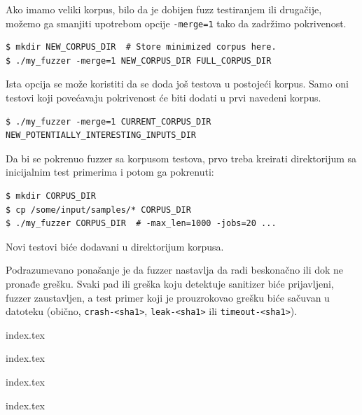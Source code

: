Ako imamo veliki korpus, bilo da je dobijen fuzz testiranjem ili drugačije, možemo ga smanjiti upotrebom opcije \texttt{-merge=1} tako da zadržimo pokrivenost.

\begin{verbatim}
$ mkdir NEW_CORPUS_DIR  # Store minimized corpus here.
$ ./my_fuzzer -merge=1 NEW_CORPUS_DIR FULL_CORPUS_DIR
\end{verbatim}

Ista opcija se može koristiti da se doda još testova u postojeći korpus. Samo oni testovi koji povećavaju pokrivenost će biti dodati u prvi navedeni korpus.

\begin{verbatim}
$ ./my_fuzzer -merge=1 CURRENT_CORPUS_DIR NEW_POTENTIALLY_INTERESTING_INPUTS_DIR
\end{verbatim}

Da bi se pokrenuo fuzzer sa korpusom testova, prvo treba kreirati direktorijum sa inicijalnim test primerima i potom ga pokrenuti:

\begin{verbatim}
$ mkdir CORPUS_DIR
$ cp /some/input/samples/* CORPUS_DIR
$ ./my_fuzzer CORPUS_DIR  # -max_len=1000 -jobs=20 ...
\end{verbatim}

Novi testovi biće dodavani u direktorijum korpusa.

Podrazumevano ponašanje je da fuzzer nastavlja da radi beskonačno ili dok ne pronađe grešku. Svaki pad ili greška koju detektuje sanitizer biće prijavljeni, fuzzer zaustavljen, a test primer koji je prouzrokovao grešku biće sačuvan u datoteku (obično, \texttt{crash-\textless{}sha1\textgreater{}}, \texttt{leak-\textless{}sha1\textgreater{}} ili \texttt{timeout-\textless{}sha1\textgreater{}}).

{index.tex}

{index.tex}

{index.tex}

{index.tex}
